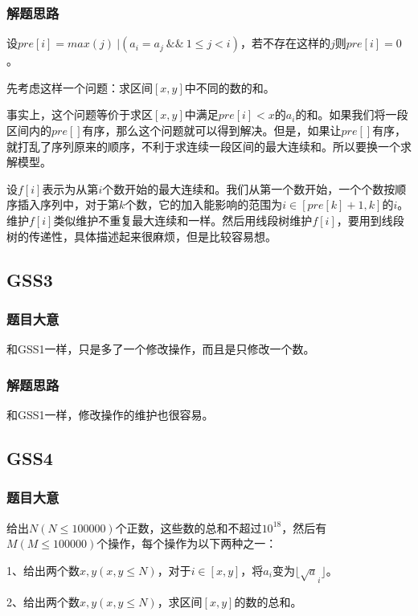 	\subsubsection{解题思路} \par
	设$pre[i]=max(j)\ \Big |(a_i=a_j\ \& \&\ 1\leq j<i) $，若不存在这样的$j$则$pre[i]=0$。\par
	先考虑这样一个问题：求区间$[x,y]$中不同的数的和。\par
	事实上，这个问题等价于求区$[x,y]$中满足$pre[i]<x$的$a_i$的和。如果我们将一段区间内的$pre[]$有序，那么这个问题就可以得到解决。但是，如果让$pre[]$有序，就打乱了序列原来的顺序，不利于求连续一段区间的最大连续和。所以要换一个求解模型。\par
	设$f[i]$表示为从第$i$个数开始的最大连续和。我们从第一个数开始，一个个数按顺序插入序列中，对于第$k$个数，它的加入能影响的范围为$i \in [pre[k]+1,k]$的$i$。维护$f[i]$类似维护不重复最大连续和一样。然后用线段树维护$f[i]$，要用到线段树的传递性，具体描述起来很麻烦，但是比较容易想。


	\subsection{GSS3}
	\subsubsection{题目大意}
		和GSS1一样，只是多了一个修改操作，而且是只修改一个数。\par
	\subsubsection{解题思路}
		和GSS1一样，修改操作的维护也很容易。



	\subsection{GSS4}
	\subsubsection{题目大意}
	给出$N(N\leq 100000)$个正数，这些数的总和不超过$10^{18}$，然后有$M(M\leq 100000)$个操作，每个操作为以下两种之一：\par
	1、给出两个数$x,y(x,y\leq N)$，对于$i\in [x,y]$，将$a_i$变为$\lfloor \sqrt a_i \rfloor$。 \par
	2、给出两个数$x,y(x,y\leq N)$，求区间$[x,y]$的数的总和。\par

